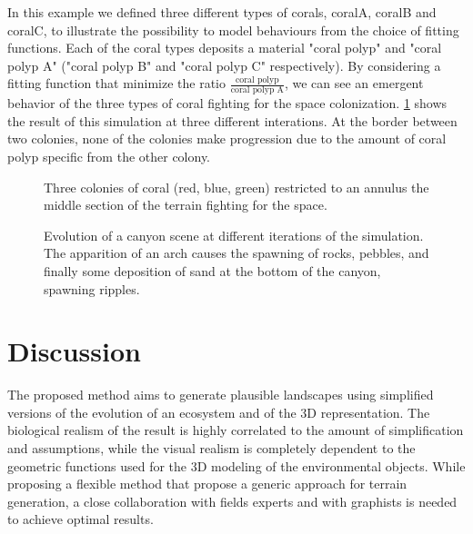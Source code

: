 In this example we defined three different types of corals, coralA, coralB and coralC, to illustrate the possibility to model behaviours from the choice of fitting functions. Each of the coral types deposits a material "coral polyp" and "coral polyp A" ("coral polyp B" and "coral polyp C" respectively). By considering a fitting function that minimize the ratio $\frac{\text{coral polyp}}{\text{coral polyp A}}$, we can see an emergent behavior of the three types of coral fighting for the space colonization.
\cref{fig:env-obj_coral-colonization-scene} shows the result of this simulation at three different interations. At the border between two colonies, none of the colonies make progression due to the amount of coral polyp specific from the other colony.

\begin{figure}
    \caption{Three colonies of coral (red, blue, green) restricted to an annulus the middle section of the terrain fighting for the space.}
    \label{fig:env-obj_coral-colonization-scene}
\end{figure}

\begin{figure}
    \caption{Evolution of a canyon scene at different iterations of the simulation. The apparition of an arch causes the spawning of rocks, pebbles, and finally some deposition of sand at the bottom of the canyon, spawning ripples. }
    \label{fig:env-obj_canyon-scene}
\end{figure}



\section{Discussion}
\label{sec:env-obj_discussion}
The proposed method aims to generate plausible landscapes using simplified versions of the evolution of an ecosystem and of the 3D representation. The biological realism of the result is highly correlated to the amount of simplification and assumptions, while the visual realism is completely dependent to the geometric functions used for the 3D modeling of the environmental objects. While proposing a flexible method that propose a generic approach for terrain generation, a close collaboration with fields experts and with graphists is needed to achieve optimal results.

